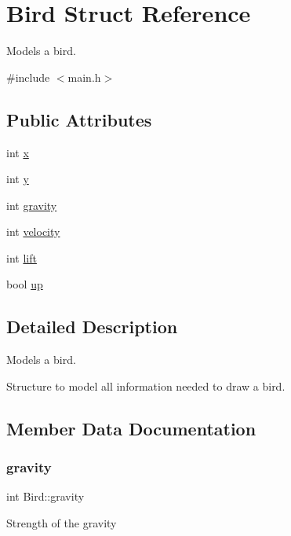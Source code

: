 \hypertarget{struct_bird}{}\section{Bird Struct Reference}
\label{struct_bird}


Models a bird.  




{\ttfamily \#include $<$main.\+h$>$}

\subsection*{Public Attributes}
\begin{DoxyCompactItemize}
\item 
int \hyperlink{struct_bird_ae4657ec5b3f2a736b7a17951590e5bea}{x}
\item 
int \hyperlink{struct_bird_ae2ece10ede5691ff56faa76969a24b3a}{y}
\item 
int \hyperlink{struct_bird_ae74e3f2b5c04d4463f78044a50d97446}{gravity}
\item 
int \hyperlink{struct_bird_a202c41f509c3e64c4e7c1c122e76ce8e}{velocity}
\item 
int \hyperlink{struct_bird_a73893a29959e1a95d0b727c015fb8049}{lift}
\item 
bool \hyperlink{struct_bird_a7736a1da7f311ccc4caf83e031177a31}{up}
\end{DoxyCompactItemize}


\subsection{Detailed Description}
Models a bird. 

Structure to model all information needed to draw a bird. 

\subsection{Member Data Documentation}
\mbox{\label{struct_bird_ae74e3f2b5c04d4463f78044a50d97446}} 
\subsubsection{\texorpdfstring{gravity}{gravity}}
{\footnotesize\ttfamily int Bird\+::gravity}

Strength of the gravity \mbox{\label{struct_bird_a73893a29959e1a95d0b727c015fb8049}} 
